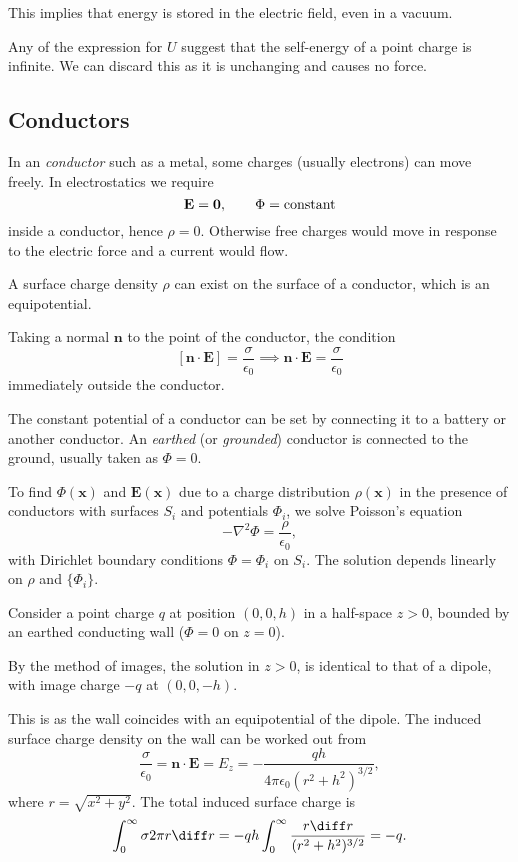 \documentclass[12pt]{article}
\begin{document}
This implies that energy is stored in the electric field, even in a vacuum.

Any of the expression for $U$ suggest that the self-energy of a point charge is infinite. We can discard this as it is unchanging and causes no force.

\subsection{Conductors}
\label{sub:conductors}

In an \emph{conductor} such as a metal, some charges (usually electrons) can move freely. In electrostatics we require
\[
	\mathbf{E} = \mathbf{0}, \qquad \Phi = \rm{constant}
\]
inside a conductor, hence $\rho = 0$. Otherwise free charges would move in response to the electric force and a current would flow.

A surface charge density $\rho$ can exist on the surface of a conductor, which is an equipotential.

Taking a normal $\mathbf{n}$ to the point of the conductor, the condition
\[
	[\mathbf{n} \cdot \mathbf{E}] = \frac{\sigma}{\epsilon_0} \implies \mathbf{n} \cdot \mathbf{E} = \frac{\sigma}{\epsilon_0}
\]
immediately outside the conductor.

The constant potential of a conductor can be set by connecting it to a battery or another conductor. An \emph{earthed} (or \emph{grounded}) conductor is connected to the ground, usually taken as $\Phi = 0$.

To find $\Phi(\mathbf{x})$ and $\mathbf{E}(\mathbf{x})$ due to a charge distribution $\rho(\mathbf{x})$ in the presence of conductors with surfaces $S_i$ and potentials $\Phi_i$, we solve Poisson's equation
\[
- \nabla^2 \Phi = \frac{\rho}{\epsilon_0}
,\]
with Dirichlet boundary conditions $\Phi = \Phi_i$ on $S_i$. The solution depends linearly on $\rho$ and $\{\Phi_i\}$.

\begin{exbox}
	Consider a point charge $q$ at position $(0,0,h)$ in a half-space $z > 0$, bounded by an earthed conducting wall ($\Phi = 0$ on $z = 0$).

	By the method of images, the solution in $z > 0$, is identical to that of a dipole, with image charge $-q$ at $(0, 0, -h)$.

	This is as the wall coincides with an equipotential of the dipole. The induced surface charge density on the wall can be worked out from
	\[
	\frac{\sigma}{\epsilon_0} = \mathbf{n} \cdot \mathbf{E} = E_z = - \frac{qh}{4 \pi \epsilon_0 (r^2 + h^2)^{3/2}}
	,\]
	where $r = \sqrt{x^2 + y^2}$. The total induced surface charge is
	\[
	\int_{0}^{\infty} \sigma 2 \pi r \diff r = - q h \int_{0}^{\infty} \frac{r \diff r}{(r^2 + h^2)^{3/2}} = -q
	.\]
\end{exbox}
\end{document}
